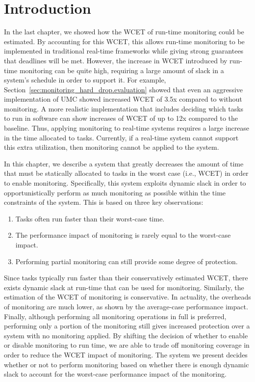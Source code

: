 \section{Introduction}
\label{sec:monitoring_hard_drop.introduction}

In the last chapter, we showed how the WCET of run-time monitoring could be
estimated. By accounting for this WCET, this allows run-time monitoring to be
implemented in traditional real-time frameworks while giving strong guarantees
that deadlines will be met. However, the increase in WCET introduced by
run-time monitoring can be quite high, requiring a large amount of slack in a
system's schedule in order to support it. For example,
Section~\ref{sec:monitoring_hard_drop.evaluation} showed that even an
aggressive implementation of UMC showed increased WCET of 3.5x compared to
without monitoring. A more realistic implementation that includes deciding
which tasks to run in software can show increases of WCET of up to 12x compared
to the baseline.  Thus, applying monitoring to real-time systems requires a
large increase in the time allocated to tasks.  Currently, if a real-time
system cannot support this extra utilization, then monitoring cannot be applied
to the system.  

In this chapter, we describe a system that greatly decreases the amount of time
that must be statically allocated to tasks in the worst case (i.e., WCET) in
order to enable monitoring. Specifically, this system exploits dynamic slack in
order to opportunistically perform as much monitoring as possible within the
time constraints of the system. This is based on three key observations:
\begin{enumerate}
  \item Tasks often run faster than their worst-case time.
  \item The performance impact of monitoring is rarely equal to the worst-case impact.
  \item Performing partial monitoring can still provide some degree of protection.
\end{enumerate}
Since tasks typically run faster than their conservatively estimated WCET,
there exists dynamic slack at run-time that can be used for monitoring.
Similarly, the estimation of the WCET of monitoring is conservative. In
actuality, the overheads of monitoring are much lower, as shown by the
average-case performance impact. Finally, although performing all monitoring
operations in full is preferred, performing only a portion of the monitoring
still gives increased protection over a system with no monitoring applied.
By shifting the decision of whether to enable or disable monitoring to
run time, we are able to trade off monitoring coverage in order to reduce the
WCET impact of monitoring. The system we present decides whether or not to
perform monitoring based on whether there is enough dynamic slack to account
for the worst-case performance impact of the monitoring.

